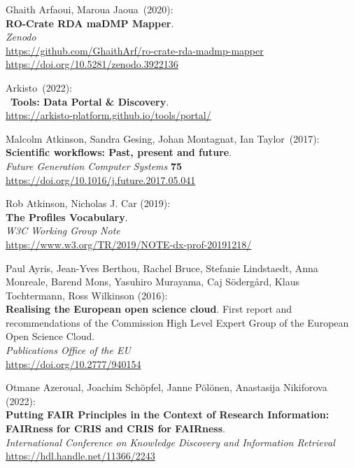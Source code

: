 \begin{thebibliography}{9}
Ghaith Arfaoui, Maroua Jaoua~(2020):\\
\textbf{RO-Crate RDA maDMP Mapper}.\\
\emph{Zenodo}\\
\url{https://github.com/GhaithArf/ro-crate-rda-madmp-mapper}\\
\url{https://doi.org/10.5281/zenodo.3922136}

Arkisto~(2022):\\
~\textbf{Tools: Data Portal \& Discovery}.\\
\url{https://arkisto-platform.github.io/tools/portal/}

Malcolm Atkinson, Sandra Gesing, Johan Montagnat, Ian Taylor~(2017):\\
\textbf{Scientific workflows: Past, present and future}.\\
\emph{Future Generation Computer Systems} \textbf{75}\\
\url{https://doi.org/10.1016/j.future.2017.05.041}

Rob Atkinson, Nicholas J. Car (2019):\\
\textbf{The Profiles Vocabulary}.\\
\emph{W3C Working Group Note}\\
\url{https://www.w3.org/TR/2019/NOTE-dx-prof-20191218/}

Paul Ayris, Jean-Yves Berthou, Rachel Bruce, Stefanie Lindstaedt, Anna Monreale, Barend Mons, Yasuhiro Murayama, Caj Södergård, Klaus Tochtermann, Ross Wilkinson (2016): \\ 
\textbf{Realising the European open science cloud}. 
First report and recommendations of the Commission High Level Expert Group of the European Open Science Cloud.\\
\emph{Publications Office of the EU} \\
\url{https://doi.org/10.2777/940154}

Otmane Azeroual, Joachim Schöpfel, Janne Pölönen, Anastasija Nikiforova (2022):\\
\textbf{Putting FAIR Principles in the Context of Research Information: FAIRness for CRIS and CRIS for FAIRness}.\\
\textit{International Conference on Knowledge Discovery and Information Retrieval}\\
\url{https://hdl.handle.net/11366/2243}


\end{thebibliography}
